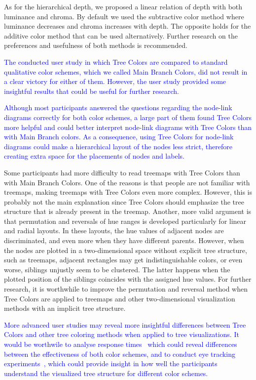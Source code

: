 \documentclass[journal]{vgtc}                %
\newcommand{\changedM}[1]{\textcolor{blue}{#1}}
\begin{document}
As for the hierarchical depth, we proposed a linear relation of depth with both luminance and chroma. By default we used the subtractive color method where luminance decreases and chroma increases with depth. The opposite holds for the additive color method that can be used alternatively. Further research on the preferences and usefulness of both methods is recommended.

\changedM{The conducted user study in which Tree Colors are compared to standard qualitative color schemes, which we called Main Branch Colors, did not result in a clear victory for either of them. However, the user study provided some insightful results that could be useful for further research.}

\changedM{Although most participants answered the questions regarding the node-link diagrams correctly for both color schemes, a large part of them found Tree Colors more helpful and could better interpret node-link diagrams with Tree Colors than with Main Branch colors. As a consequence, using Tree Colors for node-link diagrams could make a hierarchical layout of the nodes less strict, therefore creating extra space for the placements of nodes and labels.}

Some participants had more difficulty to read treemaps with Tree Colors than with Main Branch Colors. One of the reasons is that people are not familiar with treemaps, making treemaps with Tree Colors even more complex. However, this is probably not the main explanation since Tree Colors should emphasize the tree structure that is already present in the treemap. Another, more valid argument is that permutation and reversals of hue ranges is developed particularly for linear and radial layouts. In these layouts, the hue values of adjacent nodes are discriminated, and even more when they have different parents. However, when the nodes are plotted in a two-dimensional space without explicit tree structure, such as treemaps, adjacent rectangles may get indistinguishable colors, or even worse, siblings unjustly seem to be clustered. The latter happens when the plotted position of the siblings coincides with the assigned hue values. For further research, it is worthwhile to improve the permutation and reversal method when Tree Colors are applied to treemaps and other two-dimensional visualization methods with an implicit tree structure.

\changedM{More advanced user studies may reveal more insightful differences between Tree Colors and other tree coloring methods when applied to tree visualizations. 
It would be worthwile to analyse response times~\cite{wang06} which could reveal differences between the effectiveness of both color schemes, and to conduct eye tracking experiments~\cite{burch11}, which could provide insight in how well the participants understand the visualized tree structure for different color schemes.}
\end{document}
